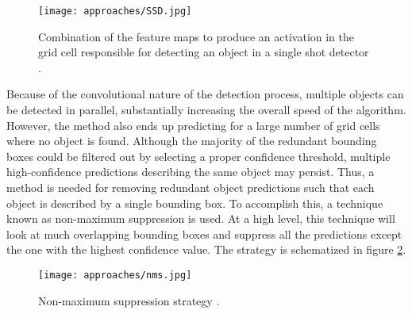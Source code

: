 \begin{figure}[h]
	\caption{Combination of the feature maps to produce an activation in the grid cell responsible for detecting an object in a single shot detector \cite{Jordan2018}.}
	\centering
	\texttt{[image: approaches/SSD.jpg]}
	\label{fig:ssd}
\end{figure}

Because of the convolutional nature of the detection process, multiple objects can be detected in parallel, substantially increasing the overall speed of the algorithm. However, the method also ends up predicting for a large number of grid cells where no object is found. Although the majority of the redundant bounding boxes could be filtered out by selecting a proper confidence threshold, multiple high-confidence predictions describing the same object may persist. Thus, a method is needed for removing redundant object predictions such that each object is described by a single bounding box. To accomplish this, a technique known as non-maximum suppression is used. At a high level, this technique will look at much overlapping bounding boxes and suppress all the predictions except the one with the highest confidence value. The strategy is schematized in figure \ref{fig:nms}.

\begin{figure}[h]
	\caption{Non-maximum suppression strategy \cite{Jordan2018}.}
	\centering
	\texttt{[image: approaches/nms.jpg]}
	\label{fig:nms}
\end{figure}

